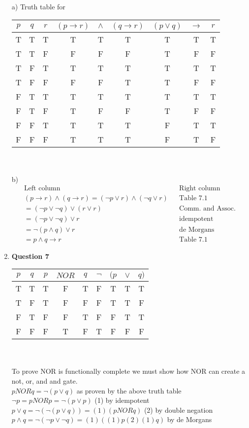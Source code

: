 \documentclass[12pt]{article}
\begin{document}
\begin{enumerate}
a) Truth table for \\
\begin{tabular}{c|c|c|ccc|ccc}
$p$ & $q$ & $r$ & $(p \rightarrow r)$ & $\land$ & $(q \rightarrow r)$ & $(p \lor q)$ & $\rightarrow$ & $r$\\ \hline
T & T & T & T & T & T & T & T & T\\
T & T & F & F & F & F & T & F & F\\
T & F & T & T & T & T & T & T & T\\
T & F & F & F & F & T & T & F & F\\
F & T & T & T & T & T & T & T & T\\
F & T & F & T & F & F & T & F & F\\
F & F & T & T & T & T & F & T & T\\
F & F & F & T & T & T & F & T & F\\
\end{tabular}\\\\
b)
\begin{align}
\textrm{Left column} && \textrm{Right column} \\
     (p \rightarrow r) \land (q \rightarrow r) = (\lnot p \lor r) \land (\lnot q \lor r)  && \textrm{Table 7.1} \\
  	  = (\lnot p \lor \lnot q) \lor (r \lor r) && \textrm{Comm. and Assoc.} \\
      = (\lnot p \lor \lnot q) \lor r && \textrm{idempotent} \\
      = \lnot (p \land q) \lor r && \textrm{de Morgans} \\
      = p \land q \rightarrow r &&  \textrm{Table 7.1} 
\end{align}


\item {\bf{Question 7}}


\begin{tabular}{c|c|ccc|cccc}
$p$ & $q$ & $p $ & $NOR$ & $q$ & $\lnot$ & $(p$ & $ \lor $ & $q)$\\ \hline
T & T & T & F & T & F & T & T & T\\
T & F & T & F & F & F & T & T & F\\
F & T & F & F & T & F & F & T & T\\
F & F & F & T & F & T & F & F & F\\
\end{tabular}\\\\
To prove NOR is functionally complete we must show how NOR can create a not, or, and and gate.\\
$p NOR q = \lnot (p \lor q)$  as proven by the above truth table\\
$\lnot p = p NOR p = \lnot (p \lor p)$ (1)  by idempotent\\
$ p \lor q = \lnot ( \lnot (p \lor q)) = (1) (p NOR q)$ (2) by double negation\\
$ p \land q = \lnot (\lnot p \lor \lnot q) = (1)( (1) p (2) (1) q )$ by de Morgans \\


\end{enumerate}
\end{document}
